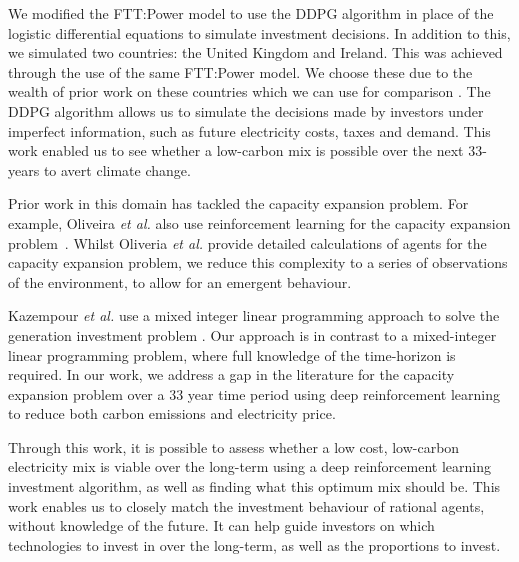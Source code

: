 We modified the FTT:Power model to use the DDPG algorithm in place of the logistic differential equations to simulate investment decisions. In addition to this, we simulated two countries: the United Kingdom and Ireland. This was achieved through the use of the same FTT:Power model. We choose these due to the wealth of prior work on these countries which we can use for comparison \cite{Hall2016, Hughes2010}. The DDPG algorithm allows us to simulate the decisions made by investors under imperfect information, such as future electricity costs, taxes and demand. This work enabled us to see whether a low-carbon mix is possible over the next 33-years to avert climate change. 


Prior work in this domain has tackled the capacity expansion problem. For example, Oliveira \textit{et al.} also use reinforcement learning for the capacity expansion problem~\cite{Oliveira2018}. Whilst Oliveria \textit{et al.} provide detailed calculations of agents for the capacity expansion problem, we reduce this complexity to a series of observations of the environment, to allow for an emergent behaviour. 

Kazempour \textit{et al.} use a mixed integer linear programming approach to solve the generation investment problem \cite{Kazempour2011}. Our approach is in contrast to a mixed-integer linear programming problem, where full knowledge of the time-horizon is required. In our work, we address a gap in the literature for the capacity expansion problem over a 33 year time period using deep reinforcement learning to reduce both carbon emissions and electricity price. 

Through this work, it is possible to assess whether a low cost, low-carbon electricity mix is viable over the long-term using a deep reinforcement learning investment algorithm, as well as finding what this optimum mix should be. This work enables us to closely match the investment behaviour of rational agents, without knowledge of the future. It can help guide investors on which technologies to invest in over the long-term, as well as the proportions to invest.


